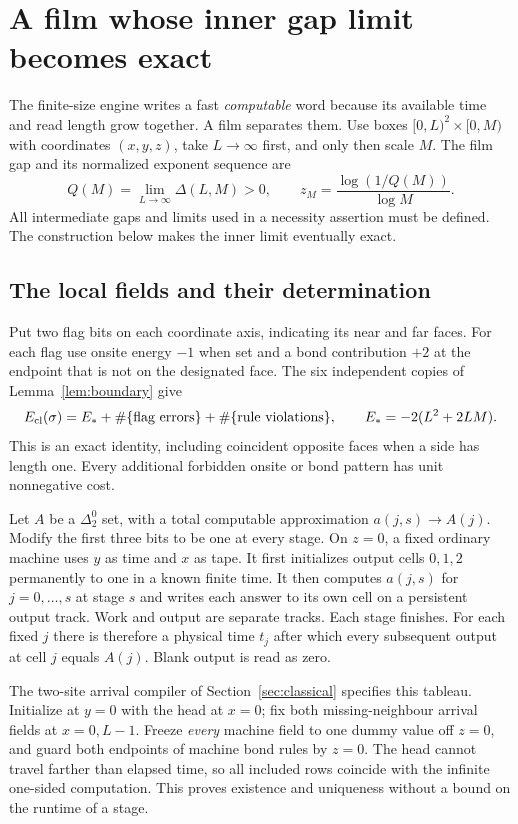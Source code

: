 \section{A film whose inner gap limit becomes exact}\label{sec:film}
The finite-size engine writes a fast \emph{computable} word because its
available time and read length grow together. A film separates them.
Use boxes $[0,L)^2\times[0,M)$ with coordinates $(x,y,z)$, take
$L\to\infty$ first, and only then scale $M$. The film gap and its
normalized exponent sequence are
\begin{equation}\label{eq:film-definition}
 Q(M)=\lim_{L\to\infty}\Delta(L,M)>0,\qquad
 z_M=\frac{\log(1/Q(M))}{\log M}.
\end{equation}
All intermediate gaps and limits used in a necessity assertion must be
defined. The construction below makes the inner limit eventually exact.

\subsection{The local fields and their determination}
Put two flag bits on each coordinate axis, indicating its near and far
faces. For each flag use onsite energy $-1$ when set and a bond
contribution $+2$ at the endpoint that is not on the designated face.
The six independent copies of Lemma~\ref{lem:boundary} give
\begin{equation}\label{eq:film-flags}
 E_{\rm cl}(\sigma)=E_*+\#\{\text{flag errors}\}
                          +\#\{\text{rule violations}\},\qquad
 E_*=-2(L^2+2LM).
\end{equation}
This is an exact identity, including coincident opposite faces when a
side has length one. Every additional forbidden onsite or bond pattern
has unit nonnegative cost.

Let $A$ be a $\Delta^0_2$ set, with a total computable approximation
$a(j,s)\to A(j)$. Modify the first three bits to be one at every stage.
On $z=0$, a fixed ordinary machine uses $y$ as time and $x$ as tape.
It first initializes output cells $0,1,2$ permanently to one in a
known finite time. It then computes $a(j,s)$ for $j=0,\ldots,s$ at stage $s$ and writes each
answer to its own cell on a persistent output track. Work and output
are separate tracks. Each stage finishes. For each fixed $j$ there is
therefore a physical time $t_j$ after which every subsequent output at
cell $j$ equals $A(j)$. Blank output is read as zero.

The two-site arrival compiler of Section~\ref{sec:classical} specifies
this tableau. Initialize at $y=0$ with the head at $x=0$; fix both
missing-neighbour arrival fields at $x=0,L-1$. Freeze \emph{every}
machine field to one dummy value off $z=0$, and guard both endpoints
of machine bond rules by $z=0$. The head cannot travel farther than
elapsed time, so all included rows coincide with the infinite
one-sided computation. This proves existence and uniqueness without
a bound on the runtime of a stage.

